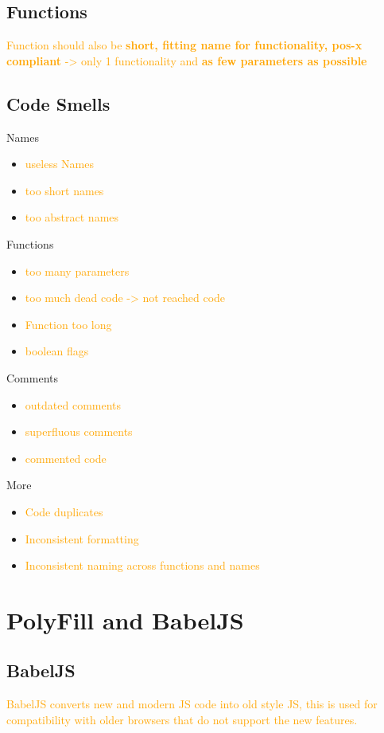 \documentclass[main.tex,fontsize=6pt,paper=a4,paper=landscape,DIV=calc,]{scrartcl}
\begin{document}
\begin{multicols*}{4}
\subsection{Functions}  
\textcolor{orange}{Function should also be \textbf{short, fitting name for functionality, pos-x compliant} -> only 1 functionality and \textbf{as few parameters as possible}}

\subsection{Code Smells}  
Names
\begin{itemize}
\item \textcolor{orange}{useless Names}
\item \textcolor{orange}{too short names}
\item \textcolor{orange}{too abstract names}
\end{itemize}
Functions
\begin{itemize}
\item \textcolor{orange}{too many parameters}
\item \textcolor{orange}{too much dead code -> not reached code}
\item \textcolor{orange}{Function too long}
\item \textcolor{orange}{boolean flags}
\end{itemize} 
Comments
\begin{itemize}
\item \textcolor{orange}{outdated comments}
\item \textcolor{orange}{superfluous comments}
\item \textcolor{orange}{commented code}
\end{itemize} 
More
\begin{itemize}
\item \textcolor{orange}{Code duplicates}
\item \textcolor{orange}{Inconsistent formatting}
\item \textcolor{orange}{Inconsistent naming across functions and names}
\end{itemize}


\section{PolyFill and BabelJS}

\subsection{BabelJS}  
\textcolor{orange}{BabelJS converts new and modern JS code into old style JS, this is used for compatibility with older browsers that do not support the new features.}


\end{multicols*}
\end{document}
